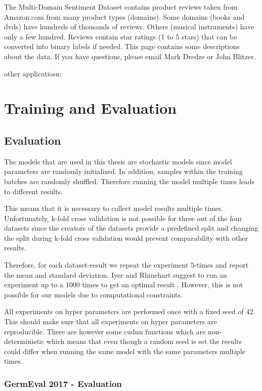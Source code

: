 The Multi-Domain Sentiment Dataset contains product reviews taken from Amazon.com from many product types (domains). Some domains (books and dvds) have hundreds of thousands of reviews. Others (musical instruments) have only a few hundred. Reviews contain star ratings (1 to 5 stars) that can be converted into binary labels if needed. This page contains some descriptions about the data. If you have questions, please email Mark Dredze or John Blitzer. 


other applicatiosn:
\cite{Blitzer2008}



\section{Training and Evaluation}
\label{sec:05_TrainingAndEvaluation}

\subsection{Evaluation}

The models that are used in this thesis are stochastic models since model parameters are randomly initialized. In addition, samples within the training batches are randomly shuffled. Therefore running the model multiple times leads to different results.

This means that it is necessary to collect model results multiple times. Unfortunately, k-fold cross validation is not possible for three out of the four datasets since the creators of the datasets provide a predefined split and changing the split during k-fold cross validation would prevent comparability with other results.

Therefore, for each dataset-result we repeat the experiment 5-times and report the mean and standard deviation. Iyer and Rhinehart suggest to run an experiment up to a 1000 times to get an optimal result \cite{Iyer1999}. However, this is not possible for our models due to computational constraints.

All experiments on hyper parameters are performed once with a fixed seed of 42. This should make sure that all experiments on hyper parameters are reproducible. There are however some cudnn functions which are non-deterministic which means that even though a random seed is set the results could differ when running the same model with the same parameters multiple times.

\subsubsection*{GermEval 2017 - Evaluation}

